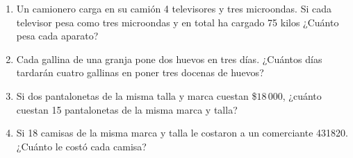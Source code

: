 \documentclass[letterpaper,fleqn]{article}
\begin{document}
\begin{enumerate}
\begin{enumerate}
 \end{enumerate}  
 \item Un camionero carga en su camión 4 televisores y tres microondas. Si cada televisor pesa como tres microondas y en total ha cargado 75 kilos ¿Cuánto pesa cada aparato?\noanswer
 \item Cada gallina de una granja pone dos huevos en tres días. ¿Cuántos días tardarán cuatro gallinas en poner tres docenas de huevos?\noanswer
 \item Si dos pantalonetas de la misma talla y marca cuestan \$$18\,000$, ¿cuánto cuestan 15 pantalonetas de la misma marca y talla?\noanswer
 \item Si 18 camisas de la misma marca y talla le costaron a un comerciante 431820. ¿Cuánto le costó cada camisa?\noanswer
 \end{enumerate}
\end{document}
